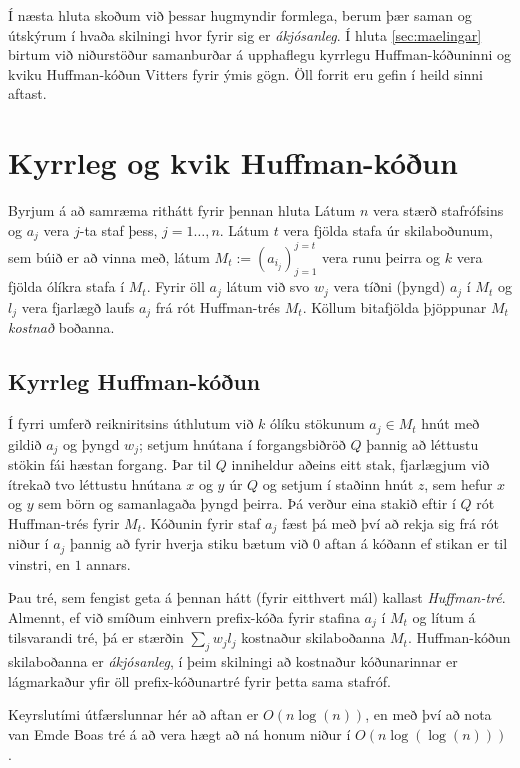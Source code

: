 \documentclass[a4paper,icelandic]{article}
\theoremstyle{default}
\theoremstyle{definition}
\theoremstyle{remark}
\begin{document}
Í næsta hluta skoðum við þessar hugmyndir formlega, berum þær saman
og útskýrum í hvaða skilningi hvor fyrir sig er \emph{ákjósanleg}. Í
hluta \ref{sec:maelingar} birtum við niðurstöður samanburðar á
upphaflegu kyrrlegu Huffman-kóðuninni og kviku Huffman-kóðun Vitters
fyrir ýmis gögn. Öll forrit eru gefin í heild sinni aftast.



\section{Kyrrleg og kvik Huffman-kóðun}

Byrjum á að samræma rithátt fyrir þennan hluta
Látum $n$ vera stærð stafrófsins og $a_j$ vera $j$-ta staf þess,
$j=1\dots,n$. Látum $t$ vera fjölda stafa úr skilaboðunum, sem búið er
að vinna með, látum $M_t := (a_{i_j})_{j=1}^{j=t}$ vera runu
þeirra og $k$ vera fjölda ólíkra stafa í $M_t$. Fyrir öll $a_j$
látum við svo $w_j$ vera tíðni (þyngd) $a_j$  í $M_t$ og
$l_j$ vera fjarlægð laufs $a_j$ frá rót Huffman-trés $M_t$.
Köllum bitafjölda þjöppunar $M_t$ \emph{kostnað}
boðanna.

\subsection{Kyrrleg Huffman-kóðun}
Í fyrri umferð reikniritsins úthlutum við $k$ ólíku stökunum 
$a_j\in M_t$ hnút með gildið $a_j$ og þyngd $w_j$; setjum
hnútana í forgangsbiðröð $Q$ þannig að léttustu stökin fái hæstan
forgang. Þar til $Q$ inniheldur aðeins eitt stak, fjarlægjum við
ítrekað tvo léttustu hnútana $x$ og $y$ úr $Q$ og setjum í staðinn hnút
$z$, sem hefur $x$ og $y$ sem börn og samanlagaða þyngd þeirra. Þá
verður eina stakið eftir í $Q$ rót Huffman-trés fyrir $M_t$. Kóðunin
fyrir staf $a_j$ fæst þá með því að rekja sig frá rót niður í $a_j$
þannig að fyrir hverja stiku bætum við $0$ aftan á kóðann ef stikan er
til vinstri, en $1$ annars. 

Þau tré, sem fengist geta á þennan hátt (fyrir eitthvert mál)
kallast \emph{Huffman-tré}. Almennt, ef við smíðum einhvern prefix-kóða
fyrir stafina $a_j$ í $M_t$ og lítum á tilsvarandi tré, þá er stærðin 
$\sum_{j} w_j l_j$ kostnaður skilaboðanna $M_t$. 
Huffman-kóðun skilaboðanna er \emph{ákjósanleg}, í þeim skilningi að
kostnaður kóðunarinnar er lágmarkaður yfir öll prefix-kóðunartré fyrir
þetta sama stafróf.

Keyrslutími útfærslunnar hér að aftan er
$O(n\log(n))$, en með því að nota van Emde Boas tré á að vera hægt að ná
honum niður í $O(n\log(\log(n)))$ \cite{mitAlgo}.
\end{document}
